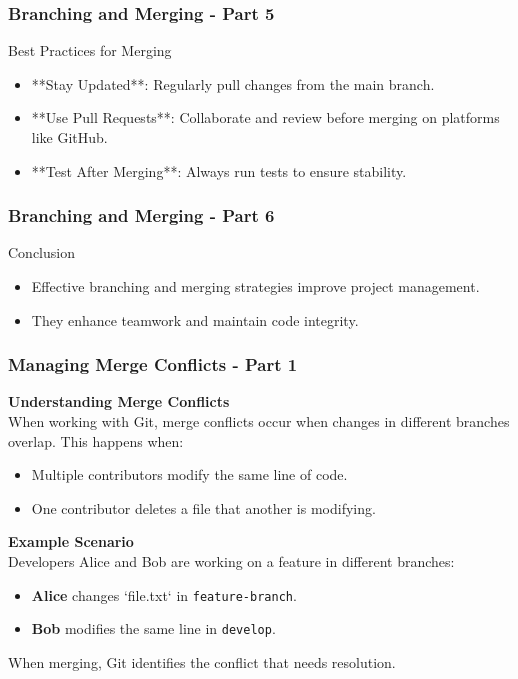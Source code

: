 \documentclass{beamer}
\begin{document}
\begin{frame}[fragile]
    \frametitle{Branching and Merging - Part 5}

    \begin{block}{Best Practices for Merging}
        \begin{itemize}
            \item **Stay Updated**: Regularly pull changes from the main branch.
            \item **Use Pull Requests**: Collaborate and review before merging on platforms like GitHub.
            \item **Test After Merging**: Always run tests to ensure stability.
        \end{itemize}
    \end{block}

\end{frame}

\begin{frame}[fragile]
    \frametitle{Branching and Merging - Part 6}

    \begin{block}{Conclusion}
        \begin{itemize}
            \item Effective branching and merging strategies improve project management.
            \item They enhance teamwork and maintain code integrity.
        \end{itemize}
    \end{block}
    
\end{frame}

\begin{frame}[fragile]
    \frametitle{Managing Merge Conflicts - Part 1}

    \textbf{Understanding Merge Conflicts} \\
    When working with Git, merge conflicts occur when changes in different branches overlap. This happens when:
    \begin{itemize}
        \item Multiple contributors modify the same line of code.
        \item One contributor deletes a file that another is modifying.
    \end{itemize}

    \textbf{Example Scenario} \\
    Developers Alice and Bob are working on a feature in different branches:
    \begin{itemize}
        \item \textbf{Alice} changes `file.txt` in \texttt{feature-branch}.
        \item \textbf{Bob} modifies the same line in \texttt{develop}.
    \end{itemize}

    When merging, Git identifies the conflict that needs resolution.
\end{frame}
\end{document}

